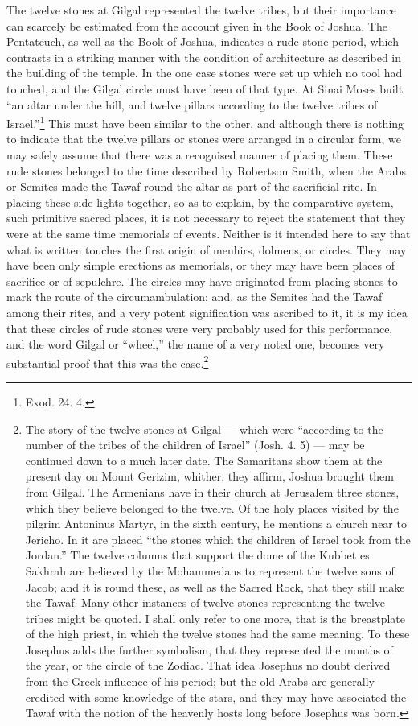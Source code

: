 \documentclass[a4paper, 11pt, oneside, polutonikogreek, english]{article}
\begin{document}
The twelve stones at Gilgal represented the twelve tribes, but their importance can scarcely be estimated from the account given in the Book of Joshua. The Pentateuch, as well as the Book of Joshua, indicates a rude stone period, which contrasts in a striking manner with the condition of architecture as described in the building of the temple. In the one case stones were set up which no tool had touched, and the Gilgal circle must have been of that type. At Sinai Moses built ``an altar under the hill, and twelve pillars according to the twelve tribes of Israel.''\footnote{Exod. 24. 4.} This must have been similar to the other, and although there is nothing to indicate that the twelve pillars or stones were arranged in a circular form, we may safely assume that there was a recognised manner of placing them. These rude stones belonged to the time described by Robertson Smith, when the Arabs or Semites made the Tawaf round the altar as part of the sacrificial rite. In placing these side-lights together, so as to explain, by the comparative system, such primitive sacred places, it is not necessary to reject the statement that they were at the same time memorials of events. Neither is it intended here to say that what is written touches the first origin of menhirs, dolmens, or circles. They may have been only simple erections as memorials, or they may have been places of sacrifice or of sepulchre. The circles may have originated from placing stones to mark the route of the circumambulation; and, as the Semites had the Tawaf among their rites, and a very potent signification was ascribed to it, it is my idea that these circles of rude stones were very probably used for this performance, and the word Gilgal or ``wheel,'' the name of a very noted one, becomes very substantial proof that this was the case.\footnote{The story of the twelve stones at Gilgal --- which were ``according to the number of the tribes of the children of Israel'' (Josh. 4. 5) --- may be continued down to a much later date. The Samaritans show them at the present day on Mount Gerizim, whither, they affirm, Joshua brought them from Gilgal. The Armenians have in their church at Jerusalem three stones, which they believe belonged to the twelve. Of the holy places visited by the pilgrim Antoninus Martyr, in the sixth century, he mentions a church near to Jericho. In it are placed ``the stones which the children of Israel took from the Jordan.'' The twelve columns that support the dome of the Kubbet es Sakhrah are believed by the Mohammedans to represent the twelve sons of Jacob; and it is round these, as well as the Sacred Rock, that they still make the Tawaf. Many other instances of twelve stones representing the twelve tribes might be quoted. I shall only refer to one more, that is the breastplate of the high priest, in which the twelve stones had the same meaning. To these Josephus adds the further symbolism, that they represented the months of the year, or the circle of the Zodiac. That idea Josephus no doubt derived from the Greek influence of his period; but the old Arabs are generally credited with some knowledge of the stars, and they may have associated the Tawaf with the notion of the heavenly hosts long before Josephus was born.}
\end{document}
